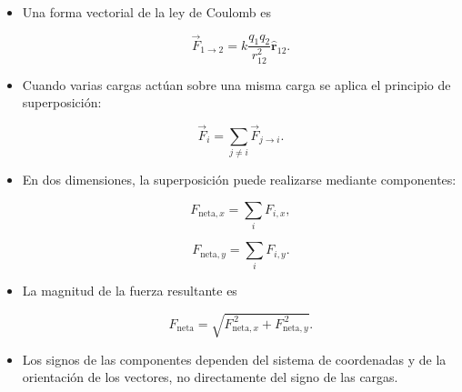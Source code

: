 \begin{resumen}
\begin{itemize}
    \item Una forma vectorial de la ley de Coulomb es

    \[
    \boxed{
    \vec{F}_{1\to2}
    =
    k
    \frac{q_1q_2}{r_{12}^{2}}
    \hat{\mathbf{r}}_{12}
    }.
    \]

    \item Cuando varias cargas actúan sobre una misma carga se aplica el
    principio de superposición:

    \[
    \boxed{
    \vec{F}_i
    =
    \sum_{j\neq i}
    \vec{F}_{j\to i}
    }.
    \]

    \item En dos dimensiones, la superposición puede realizarse mediante
    componentes:

    \[
    F_{\text{neta},x}
    =
    \sum_iF_{i,x},
    \]

    \[
    F_{\text{neta},y}
    =
    \sum_iF_{i,y}.
    \]

    \item La magnitud de la fuerza resultante es

    \[
    \boxed{
    F_{\text{neta}}
    =
    \sqrt{
    F_{\text{neta},x}^{\,2}
    +
    F_{\text{neta},y}^{\,2}
    }
    }.
    \]

    \item Los signos de las componentes dependen del sistema de coordenadas
    y de la orientación de los vectores, no directamente del signo de las
    cargas.

\end{itemize}

\end{resumen}